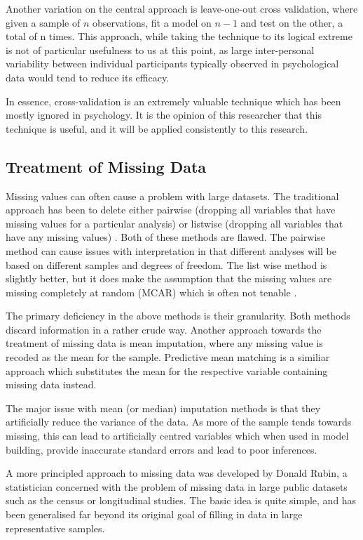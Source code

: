 Another variation on the central approach is leave-one-out cross validation, where given a sample of $n$ observations, fit a model on $n-1$ and test on the other, a total of n times. This approach, while taking the technique to its logical extreme is not of particular usefulness to us at this point, as large inter-personal variability between individual participants typically observed in psychological data would tend to reduce its efficacy\cite{friedman2009elements}.

In essence, cross-validation is an extremely valuable technique which has been mostly ignored in psychology. It is the opinion of this researcher  that this technique is useful, and it will be applied consistently to this research.

\subsection{Treatment of Missing Data}


Missing values can often cause a problem with large datasets. The
traditional approach has been to delete either pairwise (dropping
all variables that have missing values for a particular analysis)
or listwise (dropping all variables that have any missing values) \cite{graham2009missing}.
Both of these methods are flawed. The pairwise method can cause issues
with interpretation in that different analyses will be based on different
samples and degrees of freedom. The list wise method is slightly better,
but it does make the assumption that the missing values are missing
completely at random (MCAR) which is often not tenable \cite{graham2009missing}.

The primary deficiency in the above methods is their granularity. Both methods discard information in a rather crude way. Another approach towards the treatment of missing data is mean imputation, where any missing value is recoded as the mean for the sample. Predictive mean matching is a similiar approach which substitutes the mean for the respective variable containing missing data instead.

The major issue with mean (or median) imputation methods is that they artificially reduce the variance of the data. As more of the sample tends towards missing, this can lead to artificially centred variables which when used in model building, provide inaccurate standard errors and lead to poor inferences.

A more principled approach to missing data was developed by Donald Rubin, a statistician concerned with the problem of missing data in large public datasets such as the census or longitudinal studies\cite{little1987statistical}. The basic idea is quite simple, and has been generalised far beyond its original goal of filling in data in large representative samples.

